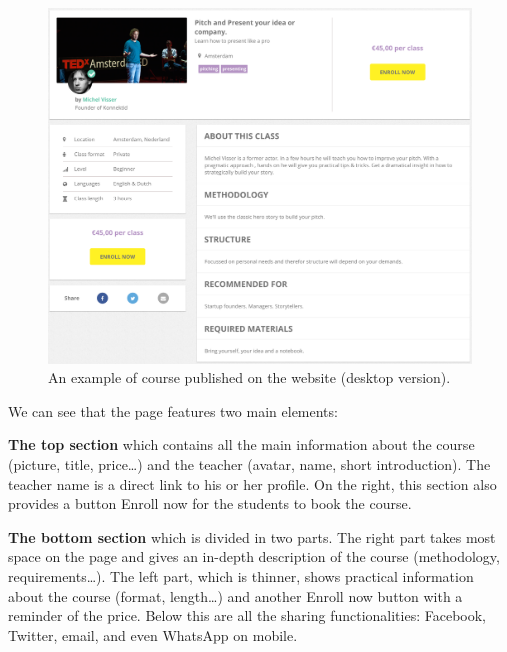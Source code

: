 \begin{figure}[H]
    \centering
    \includegraphics[scale=0.8]{figure/coursePage.png}
    \caption{An example of course published on the website (desktop version).}
    \label{fig:coursePage}
\end{figure}

We can see that the page features two main elements:

\textbf{The top section} which contains all the main information about the course (picture, title, price\ldots) and the teacher (avatar, name, short introduction).
The teacher name is a direct link to his or her profile. On the right, this section also provides a button \guillemotleft{} Enroll now \guillemotright{} for the students
to book the course.

\textbf{The bottom section} which is divided in two parts. The right part takes most space on the page and gives an in-depth description of the course
(methodology, requirements\ldots). The left part, which is thinner, shows practical information about the course (format, length\ldots) and another
\guillemotleft{} Enroll now \guillemotright{} button with a reminder of the price. Below this are all the sharing functionalities: Facebook, Twitter,
email, and even WhatsApp on mobile.

